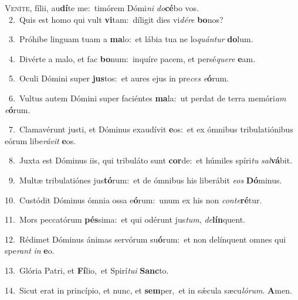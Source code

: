 \lettrine{\initial\textcolor{\initialcolor}{V}}{eníte,} fílii, au\-\textbf{dí}\-te me:~\star timórem Dómi\textit{ni} \textit{do}\-\textbf{cé}bo vos.\\
{\numbfont\textcolor{\numbcolor}{~2.}}~Quis est homo qui vult \textbf{vi}\-tam:~\star díligit dies vi\-\textit{dé}\-\textit{re} \textbf{bo}\-nos?\par
{\numbfont\textcolor{\numbcolor}{~3.}}~Próhibe linguam tuam a \textbf{ma}\-lo:~\star et lábia tua ne lo\-\textit{quán}\-\textit{tur} \textbf{do}\-lum.\par
{\numbfont\textcolor{\numbcolor}{~4.}}~Divérte a malo, et fac \textbf{bo}\-num:~\star inquíre pacem, et persé\-\textit{que}\-\textit{re} \textbf{e}\-am.\par
{\numbfont\textcolor{\numbcolor}{~5.}}~Oculi Dómini super \textbf{jus}\-tos:~\star et aures ejus in pre\textit{ces} \textit{e}\-\textbf{ó}rum.\par
{\numbfont\textcolor{\numbcolor}{~6.}}~Vultus autem Dómini super faciéntes \textbf{ma}\-la:~\star ut perdat de terra memóri\textit{am} \textit{e}\-\textbf{ó}rum.\par
{\numbfont\textcolor{\numbcolor}{~7.}}~Clamavérunt justi, et Dóminus exaudívit \textbf{e}\-os:~\star et ex ómnibus tribulatiónibus eórum libe\-\textit{rá}\-\textit{vit} \textbf{e}\-os.\par
{\numbfont\textcolor{\numbcolor}{~8.}}~Juxta est Dóminus iis, qui tribuláto sunt \textbf{cor}\-de:~\star et húmiles spíri\textit{tu} \textit{sal}\-\textbf{vá}bit.\par
{\numbfont\textcolor{\numbcolor}{~9.}}~Multæ tribulatiónes jus\-\textbf{tó}\-rum:~\star et de ómnibus his liberábit \textit{e}\-\textit{os} \textbf{Dó}\-minus.\par
{\numbfont\textcolor{\numbcolor}{10.}}~Custódit Dóminus ómnia ossa e\-\textbf{ó}\-rum:~\star unum ex his non \textit{con}\-\textit{te}\textbf{ré}tur.\par
{\numbfont\textcolor{\numbcolor}{11.}}~Mors peccatórum \textbf{pés}\-sima:~\star et qui odérunt jus\-\textit{tum}\-, \textit{de}\-\textbf{lín}quent.\par
{\numbfont\textcolor{\numbcolor}{12.}}~Rédimet Dóminus ánimas servórum su\-\textbf{ó}\-rum:~\star et non delínquent omnes qui spe\textit{rant} \textit{in} \textbf{e}\-o.\par
{\numbfont\textcolor{\numbcolor}{13.}}~Glória Patri, et \textbf{Fí}\-lio,~\star et Spirí\-\textit{tu}\-\textit{i} \textbf{Sanc}\-to.\par
{\numbfont\textcolor{\numbcolor}{14.}}~Sicut erat in princípio, et nunc, et \textbf{sem}\-per,~\star et in sǽcula sæcu\-\textit{ló}\-\textit{rum}. \textbf{A}\-men.\par
